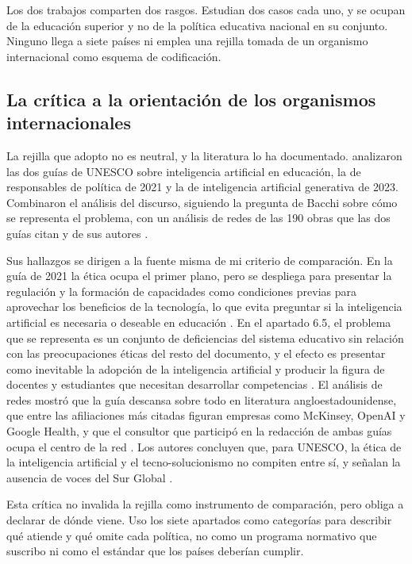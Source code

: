 Los dos trabajos comparten dos rasgos. Estudian dos casos cada uno, y se ocupan de la
educación superior y no de la política educativa nacional en su conjunto. Ninguno llega a
siete países ni emplea una rejilla tomada de un organismo internacional como esquema de
codificación.

\subsection{La crítica a la orientación de los organismos internacionales}
\label{subsec:ea-critica}

La rejilla que adopto no es neutral, y la literatura lo ha documentado.
\citet{mochizuki2025ethics} analizaron las dos guías de UNESCO sobre inteligencia
artificial en educación, la de responsables de política de 2021 y la de inteligencia
artificial generativa de 2023. Combinaron el análisis del discurso, siguiendo la pregunta
de Bacchi sobre cómo se representa el problema, con un análisis de redes de las 190 obras
que las dos guías citan y de sus autores \citep[pp.~2--4]{mochizuki2025ethics}.

Sus hallazgos se dirigen a la fuente misma de mi criterio de comparación. En la guía de
2021 la ética ocupa el primer plano, pero se despliega para presentar la regulación y la
formación de capacidades como condiciones previas para aprovechar los beneficios de la
tecnología, lo que evita preguntar si la inteligencia artificial es necesaria o deseable en
educación \citep[pp.~5, 8]{mochizuki2025ethics}. En el apartado 6.5, el problema que se
representa es un conjunto de deficiencias del sistema educativo sin relación con las
preocupaciones éticas del resto del documento, y el efecto es presentar como inevitable la
adopción de la inteligencia artificial y producir la figura de docentes y estudiantes que
necesitan desarrollar competencias \citep[p.~11]{mochizuki2025ethics}. El análisis de redes
mostró que la guía descansa sobre todo en literatura angloestadounidense, que entre las
afiliaciones más citadas figuran empresas como McKinsey, OpenAI y Google Health, y que el
consultor que participó en la redacción de ambas guías ocupa el centro de la red
\citep[pp.~12--15]{mochizuki2025ethics}. Los autores concluyen que, para UNESCO, la ética
de la inteligencia artificial y el tecno-solucionismo no compiten entre sí, y señalan la
ausencia de voces del Sur Global \citep[pp.~17--18]{mochizuki2025ethics}.

Esta crítica no invalida la rejilla como instrumento de comparación, pero obliga a declarar
de dónde viene. Uso los siete apartados como categorías para describir qué atiende y qué
omite cada política, no como un programa normativo que suscribo ni como el estándar que los
países deberían cumplir.

